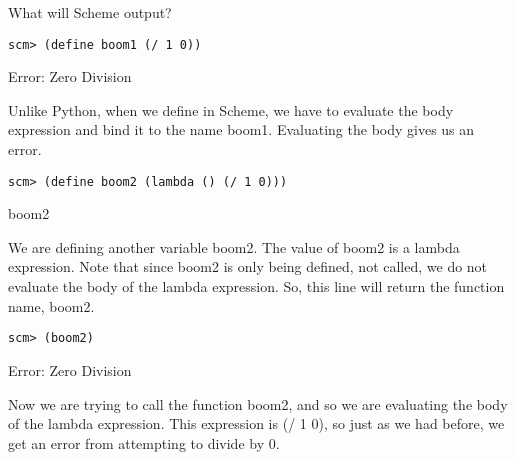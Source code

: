 \begin{blocksection}
\question What will Scheme output?

\begin{lstlisting}
scm> (define boom1 (/ 1 0))
\end{lstlisting}
\begin{solution}[0.25in]
Error: Zero Division

Unlike Python, when we define in Scheme, we have to evaluate the body expression and bind it to the name boom1. Evaluating the body gives us an error.
\end{solution}

\begin{lstlisting}
scm> (define boom2 (lambda () (/ 1 0)))
\end{lstlisting}
\begin{solution}[0.25in]
boom2

We are defining another variable boom2. The value of boom2 is a lambda expression. Note that since boom2 is only being defined, not called, we do not evaluate the body of the lambda expression. So, this line will return the function name, boom2.
\end{solution}

\begin{lstlisting}
scm> (boom2)
\end{lstlisting}
\begin{solution}[0.25in]
Error: Zero Division

Now we are trying to call the function boom2, and so we are evaluating the body of the lambda expression. This expression is (/ 1 0), so just as we had before, we get an error from attempting to divide by 0.
\end{solution}

\end{blocksection}
